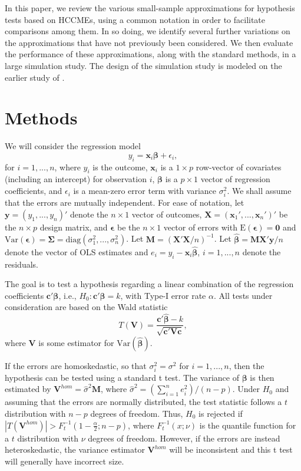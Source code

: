 \documentclass[12pt]{article}\usepackage[]{graphicx}\usepackage[]{color}
\newcommand{\E}{\text{E}}
\newcommand{\Var}{\text{Var}}
\newcommand{\diag}{\text{diag}}
\newcommand{\bm}{\mathbf}
\newcommand{\bs}{\boldsymbol}
\begin{document}
In this paper, we review the various small-sample approximations for hypothesis tests based on HCCMEs, using a common notation in order to facilitate comparisons among them. In so doing, we identify several further variations on the approximations that have not previously been considered. We then evaluate the performance of these approximations, along with the standard methods, in a large simulation study. The design of the simulation study is modeled on the earlier study of \citet{Long2000using}.

\section{Methods}
\label{sec:meth}

We will consider the regression model
\begin{equation}
y_i = \bm{x}_i\bs\beta + \epsilon_i,
\end{equation}
for $i = 1,...,n$, where $y_i$ is the outcome, $\bm{x}_i$ is a $1 \times p$ row-vector of covariates (including an intercept) for observation $i$, $\bs\beta$ is a $p \times 1$ vector of regression coefficients, and $\epsilon_i$ is a mean-zero error term with variance $\sigma_i^2$. 
We shall assume that the errors are mutually independent. 
For ease of notation, let $\bm{y} = \left(y_1,...,y_n\right)'$ denote the $n \times 1$ vector of outcomes, $\bm{X} = \left(\bm{x}_1',...,\bm{x}_n'\right)'$ be the $n \times p$ design matrix, and $\bs\epsilon$ be the $n \times 1$ vector of errors with $\E\left(\bs\epsilon\right) = \bm{0}$ and $\Var\left(\bs\epsilon\right) = \bs\Sigma = \diag\left(\sigma_1^2,...,\sigma_n^2\right)$. 
Let $\bm{M} = \left(\bm{X}'\bm{X} / n\right)^{-1}$. 
Let $\bs{\hat\beta} = \bm{M}\bm{X}'\bm{y} / n$ denote the vector of OLS estimates and $e_i = y_i - \bm{x}_i \bs{\hat\beta}$, $i = 1,...,n$ denote the residuals. 

The goal is to test a hypothesis regarding a linear combination of the regression coefficients $\bm{c}'\bs\beta$, i.e., $H_0: \bm{c}'\bs\beta = k$, with Type-I error rate $\alpha$. 
All tests under consideration are based on the Wald statistic
\begin{equation}
T(\bm{V}) = \frac{\bm{c}'\bs{\hat\beta} - k}{\sqrt{\bm{c}' \bm{V} \bm{c}}},
\end{equation}
where $\bm{V}$ is some estimator for $\Var\left(\bs{\hat\beta}\right)$. 

If the errors are homoskedastic, so that $\sigma_i^2 = \sigma^2$ for $i = 1,...,n$, then the hypothesis can be tested using a standard t test. 
The variance of $\bs\beta$ is then estimated by $\bm{V}^{hom} = \hat\sigma^2 \bm{M}$, where $\hat\sigma^2 = \left(\sum_{i=1}^n e_i^2\right) / (n - p)$. 
Under $H_0$ and assuming that the errors are normally distributed, the test statistic follows a $t$ distribution with $n - p$ degrees of freedom. 
Thus, $H_0$ is rejected if $\left|T\left(\bm{V}^{hom}\right)\right| > F_t^{-1}\left(1 - \frac{\alpha}{2}; n - p\right)$, where $F_t^{-1}(x; \nu)$ is the quantile function for a $t$ distribution with $\nu$ degrees of freedom. 
However, if the errors are instead heteroskedastic, the variance estimator $\bm{V}^{hom}$ will be inconsistent and this t test will generally have incorrect size. 
\end{document}
